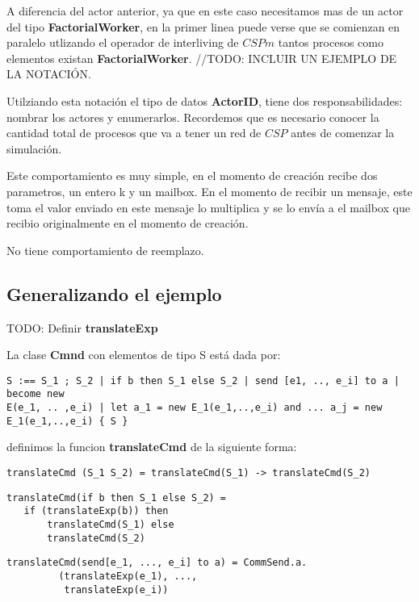 \documentclass[fleqn]{article}
\begin{document}
A diferencia del actor anterior, ya que en este caso necesitamos mas de un actor
del tipo \textbf{FactorialWorker}, en la primer linea puede verse que se
comienzan en paralelo utlizando el operador de interliving de $CSPm$ tantos
procesos como elementos existan \textbf{FactorialWorker}. //TODO: INCLUIR UN
EJEMPLO DE LA NOTACIÓN.

Utilziando esta notación el tipo de datos \textbf{ActorID}, tiene dos
responsabilidades: nombrar los actores y enumerarlos. Recordemos que es
necesario conocer la cantidad total de procesos que va a tener un red de $CSP$
antes de comenzar la simulación.

Este comportamiento es muy simple, en el momento de creación recibe dos
parametros, un entero k y un mailbox. En el momento de recibir un mensaje, este
toma el valor enviado en este mensaje lo multiplica y se lo envía a el mailbox
que recibio originalmente en el momento de creación.

No tiene comportamiento de reemplazo.

\subsection{Generalizando el ejemplo}

TODO: Definir \textbf{translateExp}

La clase \textbf{Cmnd} con elementos de tipo S está dada por:

\begin{verbatim}
S :== S_1 ; S_2 | if b then S_1 else S_2 | send [e1, .., e_i] to a | become new
E(e_1, .. ,e_i) | let a_1 = new E_1(e_1,..,e_i) and ... a_j = new
E_1(e_1,..,e_i) { S } 
\end{verbatim}

definimos la funcion \textbf{translateCmd} de la siguiente forma:

\begin{verbatim}
translateCmd (S_1 S_2) = translateCmd(S_1) -> translateCmd(S_2)
\end{verbatim}


\begin{verbatim}
translateCmd(if b then S_1 else S_2) = 
   if (translateExp(b)) then
       translateCmd(S_1) else 
       translateCmd(S_2)
\end{verbatim}

\begin{verbatim}
translateCmd(send[e_1, ..., e_i] to a) = CommSend.a.
         (translateExp(e_1), ..., 
          translateExp(e_i)) 
\end{verbatim}
\end{document}
